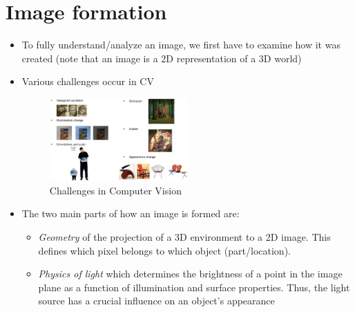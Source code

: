 \section{Image formation}
\label{sec:img_formation}
\begin{itemize}
	\item To fully understand/analyze an image, we first have to examine how it was created (note that an image is a 2D representation of a 3D world)
	\item Various challenges occur in CV 
	\begin{figure}[ht!]
		\centering
		\includegraphics[width=0.5\textwidth]{figures/cv_image_formation_challenges_cv.png}
		\caption{Challenges in Computer Vision}
	\end{figure}
	\item The two main parts of how an image is formed are:
	\begin{itemize}
		\item \textit{Geometry} of the projection of a 3D environment to a 2D image. This defines which pixel belongs to which object (part/location). 
		\item \textit{Physics of light} which determines the brightness of a point in the image plane as a function of illumination and surface properties. Thus, the light source has a crucial influence on an object's appearance 
	\end{itemize}
\end{itemize}
